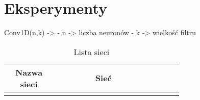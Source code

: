 \newpage %
\section{Eksperymenty}


Conv1D(n,k) ->
- n -> liczba neuronów
- k -> wielkość filtru

\begin{longtable}{| c | m{0.58\linewidth} | r | m{0.1\linewidth} |}
    \caption{Lista sieci}                                      \\
    \hline
    Nazwa sieci                    & \multicolumn{1}{c|}{Sieć} \\ \hline\hline \endfirsthead

    \endfoot
    \hline \endlastfoot




\end{longtable}
